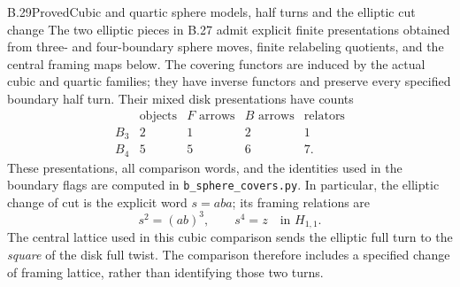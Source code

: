 \begin{result}{B.29}{Proved}{Cubic and quartic sphere models, half turns and the elliptic cut change}
The two elliptic pieces in B.27 admit explicit finite presentations
obtained from three- and four-boundary sphere moves, finite
relabeling quotients, and the central framing maps below.  The
covering functors are induced by the actual cubic and quartic
families; they have inverse functors and preserve every specified
boundary half turn.  Their mixed disk presentations have counts
\[
\begin{array}{c|rrrr}
 &\text{objects}&F\text{ arrows}&B\text{ arrows}&\text{relators}\\\hline
 B_3&2&1&2&1\\
 B_4&5&5&6&7.
\end{array}                                                     \tag{B.88}
\]
These presentations, all comparison words, and the identities used
in the boundary flags are computed in
\texttt{b\_sphere\_covers.py}.  In particular, the elliptic change
of cut is the explicit word $s=aba$; its framing relations are
\[
 s^2=(ab)^3,\qquad s^4=z\quad\text{in }H_{1,1}.                 \tag{B.89}
\]
The central lattice used in this cubic comparison sends the
elliptic full turn to the \emph{square} of the disk full twist.
The comparison therefore includes a specified change of framing
lattice, rather than identifying those two turns.
\end{result}
